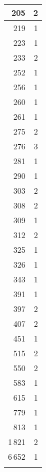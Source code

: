 \begin{tabular}{|r|r|}
\hline
205&2\\
\hline
219&1\\
\hline
223&1\\
\hline
233&2\\
\hline
252&1\\
\hline
256&1\\
\hline
260&1\\
\hline
261&1\\
\hline
275&2\\
\hline
276&3\\
\hline
281&1\\
\hline
290&1\\
\hline
303&2\\
\hline
308&2\\
\hline
309&1\\
\hline
312&2\\
\hline
325&1\\
\hline
326&1\\
\hline
343&1\\
\hline
391&1\\
\hline
397&2\\
\hline
407&2\\
\hline
451&1\\
\hline
515&2\\
\hline
550&2\\
\hline
583&1\\
\hline
615&1\\
\hline
779&1\\
\hline
813&1\\
\hline
1\,821&2\\
\hline
6\,652&1\\
\hline
&\\
\hline
\end{tabular}
\begin{tabular}{|r|r|}
\hline
\end{tabular}
